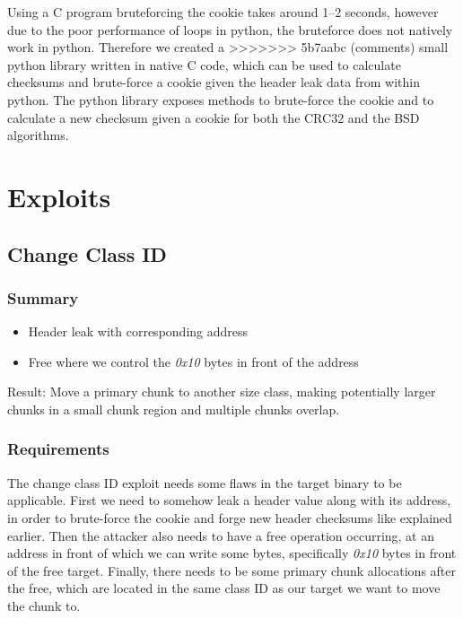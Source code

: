 \documentclass[a4paper,11pt,oneside]{report}
\begin{document}
Using a C program bruteforcing the cookie takes around 1–2 seconds, 
however due to the poor performance of
loops in python, the bruteforce does not natively work in python. Therefore we created a
>>>>>>> 5b7aabc (comments)
small python library written in native C code, which can be used to calculate checksums
and brute-force a cookie given the header leak data from within python. The python library
exposes methods to brute-force the cookie and to calculate a new checksum given a cookie
for both the CRC32 and the BSD algorithms.


\chapter{Exploits}

\section{Change Class ID}



\subsection{Summary}

\begin{itemize}
\item Header leak with corresponding address
\item Free where we control the \emph{0x10} bytes in front of the address
\end{itemize}

Result: Move a primary chunk to another size class, making potentially larger chunks in a
small chunk region and multiple chunks overlap.

\subsection{Requirements}

The change class ID exploit needs some flaws in the target binary to be applicable.  First
we need to somehow leak a header value along with its address, in order to brute-force the
cookie and forge new header checksums like explained earlier. Then the attacker also needs
to have a free operation occurring, at an address in front of which we can write some
bytes, specifically \emph{0x10} bytes in front of the free target. Finally, there needs to
be some primary chunk allocations after the free, which are located in the same class ID
as our target we want to move the chunk to.
\end{document}
